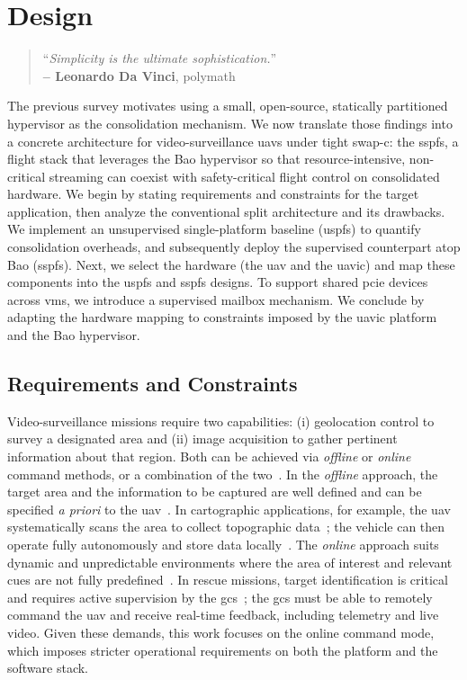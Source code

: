 %
\chapter{Design}%
\label{ch:design}
\begin{quote}
\begin{flushright}
``\emph{Simplicity is the ultimate sophistication.}'' \\
\textbf{-- Leonardo Da Vinci}, polymath
\end{flushright}
\end{quote}

The previous survey motivates using a small, open-source, statically partitioned
hypervisor as the consolidation mechanism. We now translate those findings into
a concrete architecture for video-surveillance \glspl{uav} under tight \gls{swap-c}:
the \gls{sspfs}, a flight stack that leverages the Bao hypervisor so that
resource-intensive, non-critical streaming can coexist with safety-critical
flight control on consolidated hardware.
%
We begin by stating requirements and constraints for the target application, then
analyze the conventional split architecture and its drawbacks. We implement an
unsupervised single-platform baseline (\gls{uspfs}) to quantify consolidation
overheads, and subsequently deploy the supervised counterpart atop Bao
(\gls{sspfs}).
%
Next, we select the hardware (the \gls{uav} and the \gls{uavic}) and map these
components into the \gls{uspfs} and \gls{sspfs} designs. To support shared
\gls{pcie} devices across \glspl{vm}, we introduce a supervised mailbox
mechanism. We conclude by adapting the hardware mapping to constraints imposed
by the \gls{uavic} platform and the Bao hypervisor.

\section{Requirements and Constraints}
\label{sec:req-sec}

Video-surveillance missions require two capabilities: (i) geolocation control to
survey a designated area and (ii) image acquisition to gather pertinent
information about that region. Both can be achieved via \emph{offline} or
\emph{online} command methods, or a combination of the two~\cite{gugan2023path}.
%
In the \emph{offline} approach, the target area and the information to be
captured are well defined and can be specified \emph{a priori} to the
\gls{uav}~\cite{gugan2023path}. In cartographic applications, for example, the
\gls{uav} systematically scans the area to collect topographic
data~\cite{caroti_uav-borne_2017}; the vehicle can then operate fully
autonomously and store data locally~\cite{qgc-survey}.
%
The \emph{online} approach suits dynamic and unpredictable environments where
the area of interest and relevant cues are not fully
predefined~\cite{gugan2023path}. In rescue missions, target identification is
critical and requires active supervision by the
\gls{gcs}~\cite{mohsan2022towards}; the \gls{gcs} must be able to remotely
command the \gls{uav} and receive real-time feedback, including telemetry and
live video.
%
Given these demands, this work focuses on the online command mode, which imposes stricter operational requirements on both the platform and the software stack.


